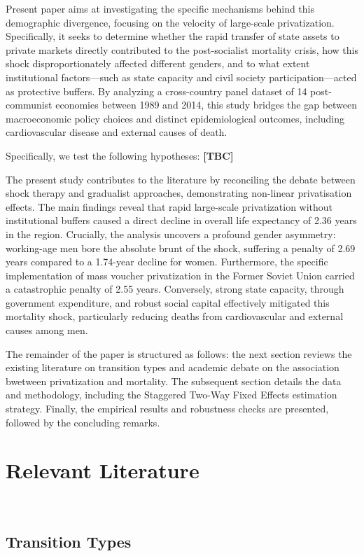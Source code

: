 \documentclass[12pt]{article}
\begin{document}
Present paper aims at investigating the specific mechanisms behind this demographic divergence, focusing on the velocity of large-scale privatization. 
Specifically, it seeks to determine whether the rapid transfer of state assets to private markets directly contributed to the post-socialist mortality crisis, 
how this shock disproportionately affected different genders, and to what extent institutional factors—such as state capacity and civil society participation—acted 
as protective buffers. By analyzing a cross-country panel dataset of 14 post-communist economies between 1989 and 2014, this study bridges the gap between 
macroeconomic policy choices and distinct epidemiological outcomes, including cardiovascular disease and external causes of death. 

Specifically, we test the following hypotheses:
\textbf{[TBC]}

The present study contributes to the literature by reconciling the debate between shock therapy and gradualist approaches, demonstrating non-linear privatisation effects. The main findings reveal that rapid large-scale privatization without 
institutional buffers caused a direct decline in overall life expectancy of 2.36 years in the region. Crucially, the analysis uncovers a profound gender asymmetry: 
working-age men bore the absolute brunt of the shock, suffering a penalty of 2.69 years compared to a 1.74-year decline for women. Furthermore, 
the specific implementation of mass voucher privatization in the Former Soviet Union carried a catastrophic penalty of 2.55 years. Conversely, 
strong state capacity, through government expenditure, and robust social capital effectively mitigated this mortality shock, particularly reducing 
deaths from cardiovascular and external causes among men.

The remainder of the paper is structured as follows: the next section reviews the existing literature on transition types and academic debate on the association bwetween privatization and mortality. The 
subsequent section details the data and methodology, including the Staggered Two-Way Fixed Effects estimation strategy. Finally, the empirical results 
and robustness checks are presented, followed by the concluding remarks.

\section{Relevant Literature}\
\subsection{Transition Types}\
\end{document}
